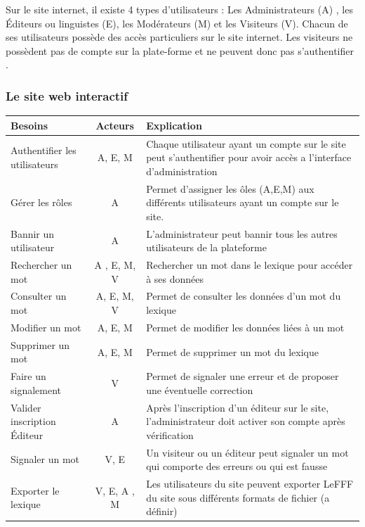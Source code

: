\documentclass[12pt,a4paper]{article}
\begin{document}
Sur le site internet, il existe 4 types d’utilisateurs : Les Administrateurs (A) , les Éditeurs ou linguistes (E), les Modérateurs (M) et les Visiteurs (V).
Chacun de ses utilisateurs possède des accès particuliers sur le site internet.
Les visiteurs ne possèdent pas de compte sur la plate-forme et ne peuvent donc pas s'authentifier . 

\subsubsection{Le site web interactif}
\begin{tabularx}{\textwidth}{|l|c|X|}
  \hline
  \textbf{Besoins} & 
  \textbf{Acteurs} & 
  \textbf{Explication} \\
  \hline
  Authentifier les utilisateurs & 
  A, E, M & 
  Chaque utilisateur ayant un compte sur le site peut s'authentifier pour avoir accès a l'interface d'administration \\ 
  \hline
  Gérer les rôles & A
   & Permet d'assigner les ôles (A,E,M) aux différents utilisateurs ayant un compte sur le site.
 \\
  \hline
  Bannir un utilisateur& 
  A & 
  L'administrateur peut bannir tous les autres utilisateurs de la plateforme \\
  \hline
  Rechercher un mot & 
  A , E, M, V & 
  Rechercher un mot dans le lexique pour accéder à ses données \\
  \hline
  Consulter un mot &
  A, E, M, V &
  Permet de consulter les données d'un mot du lexique \\
  \hline
  Modifier un mot &
  A, E, M & 
  Permet de modifier les données liées à un mot \\
  \hline
  Supprimer un mot &
  A, E, M & 
  Permet de supprimer un mot du lexique \\
  \hline
  Faire un signalement & 
  V &
  Permet de signaler une erreur et de proposer une éventuelle correction \\
  \hline
  Valider inscription Éditeur &
  A &
  Après l'inscription d'un éditeur sur le site, l'administrateur doit activer son compte après vérification \\
  \hline
  Signaler un mot &
  V, E &
  Un visiteur ou un éditeur peut signaler un mot qui comporte des erreurs ou qui est fausse \\
  \hline
  Exporter le lexique &
  V, E, A , M &
  Les utilisateurs du site peuvent exporter LeFFF du site sous différents formats de fichier (a définir)\\
  \hline
\end{tabularx}
\end{document}
